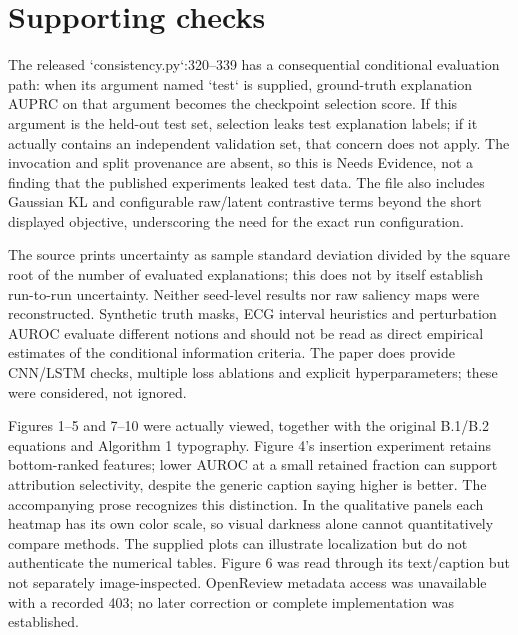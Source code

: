 \documentclass[10pt]{article}
\begin{document}
\section*{Supporting checks}
The released `consistency.py`:320–339 has a consequential conditional evaluation path: when its argument named `test` is supplied, ground-truth explanation AUPRC on that argument becomes the checkpoint selection score. If this argument is the held-out test set, selection leaks test explanation labels; if it actually contains an independent validation set, that concern does not apply. The invocation and split provenance are absent, so this is Needs Evidence, not a finding that the published experiments leaked test data. The file also includes Gaussian KL and configurable raw/latent contrastive terms beyond the short displayed objective, underscoring the need for the exact run configuration.\par
The source prints uncertainty as sample standard deviation divided by the square root of the number of evaluated explanations; this does not by itself establish run-to-run uncertainty. Neither seed-level results nor raw saliency maps were reconstructed. Synthetic truth masks, ECG interval heuristics and perturbation AUROC evaluate different notions and should not be read as direct empirical estimates of the conditional information criteria. The paper does provide CNN/LSTM checks, multiple loss ablations and explicit hyperparameters; these were considered, not ignored.\par
Figures 1–5 and 7–10 were actually viewed, together with the original B.1/B.2 equations and Algorithm 1 typography. Figure 4’s insertion experiment retains bottom-ranked features; lower AUROC at a small retained fraction can support attribution selectivity, despite the generic caption saying higher is better. The accompanying prose recognizes this distinction. In the qualitative panels each heatmap has its own color scale, so visual darkness alone cannot quantitatively compare methods. The supplied plots can illustrate localization but do not authenticate the numerical tables. Figure 6 was read through its text/caption but not separately image-inspected. OpenReview metadata access was unavailable with a recorded 403; no later correction or complete implementation was established.\par
\end{document}
